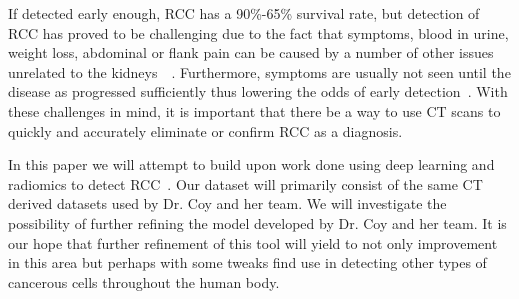 \documentclass[10pt,journal,compsoc]{IEEEtran}
\begin{document}
If detected early enough, RCC has a 90\%-65\% survival rate, but detection of RCC has proved to be challenging due to the fact that symptoms, blood in urine, weight loss, abdominal or flank pain can be caused by a number of other issues unrelated to the kidneys~\cite{cite6}~\cite{cite7}. Furthermore, symptoms are usually not seen until the disease as progressed sufficiently thus lowering the odds of early detection~\cite{cite6}.  With these challenges in mind, it is important that there be a way to use CT scans to quickly and accurately eliminate or confirm RCC as a diagnosis.

In this paper we will attempt to build upon work done using deep learning and radiomics to detect RCC~\cite{cite5}.  Our dataset will primarily consist of the same CT derived datasets used by Dr. Coy and her team.  We will investigate the possibility of further refining the model developed by Dr. Coy and her team. It is our hope that further refinement of this tool will yield to not only improvement in this area but perhaps with some tweaks find use in detecting other types of cancerous cells throughout the human body.

\cleardoublepage

{}


\end{document}
